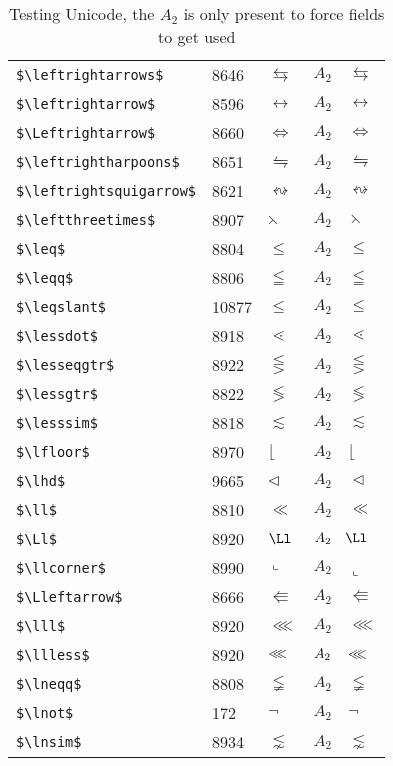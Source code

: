 \documentclass{article}
\begin{document}
\begin{table}
\begin{center}
\begin{tabular}{llll}
 \verb#$\leftrightarrows$#    & 8646 & $\leftrightarrows$    & $A_2\quad \leftrightarrows$\\
 \verb#$\leftrightarrow$#     & 8596 & $\leftrightarrow$     & $A_2\quad \leftrightarrow$\\
 \verb#$\Leftrightarrow$#     & 8660 & $\Leftrightarrow$     & $A_2\quad \Leftrightarrow$\\
 \verb#$\leftrightharpoons$#  & 8651 & $\leftrightharpoons$  & $A_2\quad \leftrightharpoons$\\
 \verb#$\leftrightsquigarrow$#& 8621 & $\leftrightsquigarrow$& $A_2\quad \leftrightsquigarrow$\\
 \verb#$\leftthreetimes$#     & 8907 & $\leftthreetimes$     & $A_2\quad \leftthreetimes$\\
 \verb#$\leq$#                & 8804 & $\leq$                & $A_2\quad \leq$\\
 \verb#$\leqq$#               & 8806 & $\leqq$               & $A_2\quad \leqq$\\
 \verb#$\leqslant$#          & 10877 & $\leqslant$           & $A_2\quad \leqslant$\\
 \verb#$\lessdot$#            & 8918 & $\lessdot$            & $A_2\quad \lessdot$\\
 \verb#$\lesseqgtr$#          & 8922 & $\lesseqgtr$          & $A_2\quad \lesseqgtr$\\
 \verb#$\lessgtr$#            & 8822 & $\lessgtr$            & $A_2\quad \lessgtr$\\
 \verb#$\lesssim$#            & 8818 & $\lesssim$            & $A_2\quad \lesssim$\\
 \verb#$\lfloor$#             & 8970 & $\lfloor$             & $A_2\quad \lfloor$\\
 \verb#$\lhd$#                & 9665 & $\lhd$                & $A_2\quad \lhd$\\
 \verb#$\ll$#                 & 8810 & $\ll$                 & $A_2\quad \ll$\\
 \verb#$\Ll$#                 & 8920 & $\Ll$                 & $A_2\quad \Ll$\\
 \verb#$\llcorner$#           & 8990 & $\llcorner$           & $A_2\quad \llcorner$\\
 \verb#$\Lleftarrow$#         & 8666 & $\Lleftarrow$         & $A_2\quad \Lleftarrow$\\
 \verb#$\lll$#                & 8920 & $\lll$                & $A_2\quad \lll$\\
 \verb#$\llless$#             & 8920 & $\llless$             & $A_2\quad \llless$\\
 \verb#$\lneqq$#              & 8808 & $\lneqq$              & $A_2\quad \lneqq$\\
 \verb#$\lnot$#                & 172 & $\lnot$               & $A_2\quad \lnot$\\
 \verb#$\lnsim$#              & 8934 & $\lnsim$              & $A_2\quad \lnsim$\\
\end{tabular}
\end{center}
\caption{Testing Unicode, the $A_2$ is only present to force fields to get used}
\end{table}
\end{document}
